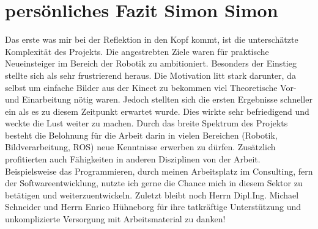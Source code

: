 \section{persönliches Fazit Simon Simon}
Das erste was mir bei der Reflektion in den Kopf kommt, ist die unterschätzte Komplexität des Projekts. Die angestrebten Ziele waren für praktische Neueinsteiger im Bereich der Robotik zu ambitioniert. Besonders der Einstieg stellte sich als sehr frustrierend heraus. Die Motivation litt stark darunter, da selbst um einfache Bilder aus der Kinect zu bekommen viel Theoretische Vor- und Einarbeitung nötig waren. Jedoch stellten sich die ersten Ergebnisse schneller ein als es zu diesem Zeitpunkt erwartet wurde. Dies wirkte sehr befriedigend und weckte die Lust weiter zu machen. Durch das breite Spektrum des Projekts besteht die Belohnung für die Arbeit darin in vielen Bereichen (Robotik, Bildverarbeitung, ROS) neue Kenntnisse erwerben zu dürfen. Zusätzlich profitierten auch Fähigkeiten in anderen Disziplinen von der Arbeit. Beispielsweise das Programmieren, durch meinen Arbeitsplatz im Consulting, fern der Softwareentwicklung, nutzte ich gerne die Chance mich in diesem Sektor zu betätigen und weiterzuentwickeln. Zuletzt bleibt noch Herrn Dipl.Ing. Michael Schneider und Herrn Enrico Hühneborg für ihre tatkräftige Unterstützung und unkomplizierte Versorgung mit Arbeitsmaterial zu danken!
